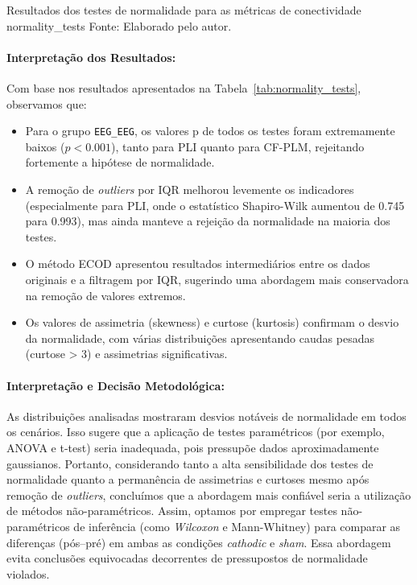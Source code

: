 {Resultados dos testes de normalidade para as métricas de conectividade}
{normality_tests}
{Fonte: Elaborado pelo autor.}

\paragraph{Interpretação dos Resultados:}
Com base nos resultados apresentados na Tabela~\ref{tab:normality_tests}, observamos que:

\begin{itemize}
    \item Para o grupo \texttt{EEG\_EEG}, os valores p de todos os testes foram extremamente baixos ($p < 0.001$), tanto para PLI quanto para CF-PLM, rejeitando fortemente a hipótese de normalidade.
    
    \item A remoção de \textit{outliers} por IQR melhorou levemente os indicadores (especialmente para PLI, onde o estatístico Shapiro-Wilk aumentou de 0.745 para 0.993), mas ainda manteve a rejeição da normalidade na maioria dos testes.
    
    \item O método ECOD apresentou resultados intermediários entre os dados originais e a filtragem por IQR, sugerindo uma abordagem mais conservadora na remoção de valores extremos.
    
    \item Os valores de assimetria (skewness) e curtose (kurtosis) confirmam o desvio da normalidade, com várias distribuições apresentando caudas pesadas (curtose > 3) e assimetrias significativas.
\end{itemize}

\paragraph{Interpretação e Decisão Metodológica:}
As distribuições analisadas mostraram desvios notáveis de normalidade em todos os cenários. Isso sugere que a aplicação de testes paramétricos (por exemplo, ANOVA e t-test) seria inadequada, pois pressupõe dados aproximadamente gaussianos. 
Portanto, considerando tanto a alta sensibilidade dos testes de normalidade quanto a permanência de assimetrias e curtoses mesmo após remoção de \textit{outliers}, concluímos que a abordagem mais confiável seria a utilização de métodos não-paramétricos.
Assim, optamos por empregar testes não-paramétricos de inferência (como \textit{Wilcoxon} e Mann-Whitney) para comparar as diferenças (pós--pré) em ambas as condições \textit{cathodic} e \textit{sham}. Essa abordagem evita conclusões equivocadas decorrentes de pressupostos de normalidade violados.
